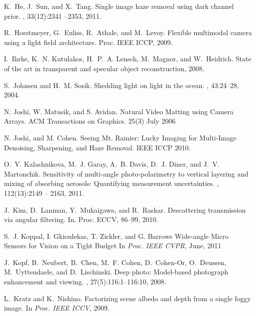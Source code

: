 \documentclass[10pt,twocolumn,letterpaper]{article}
\begin{document}
{\begin{thebibliography}{10}
K.~He, J.~Sun, and X.~Tang.
\newblock Single image haze removal using dark channel prior.
, 33(12):2341 --2353, 2011.

R.~Horstmeyer, G.~Euliss, R.~Athale, and M.~Levoy.
\newblock Flexible multimodal camera using a light field architecture.
\newblock Proc. IEEE ICCP, 2009.

I.~Ihrke, K.~N. Kutulakos, H.~P.~A. Lensch, M.~Magnor, and W.~Heidrich.
\newblock State of the art in transparent and specular object reconstruction,
  2008.

S.~Johnsen and H.~M. Sosik.
\newblock Shedding light on light in the ocean.
, 43:24--28, 2004.

N. Joshi, W. Matusik, and S. Avidan.
\newblock Natural Video Matting using Camera Arrays.
\newblock ACM Transactions on Graphics. 25(3) July 2006

N. Joshi, and M. Cohen.
\newblock Seeing Mt. Rainier: Lucky Imaging for Multi-Image Denoising, Sharpening, and Haze Removal.
\newblock IEEE ICCP 2010.

O.~V. Kalashnikova, M.~J. Garay, A.~B. Davis, D.~J. Diner, and J.~V.
  Martonchik.
\newblock Sensitivity of multi-angle photo-polarimetry to vertical layering and
  mixing of absorbing aerosols: Quantifying measurement uncertainties.
,
  112(13):2149 -- 2163, 2011.

J.~Kim, D.~Lanman, Y.~Mukaigawa, and R.~Raskar.
\newblock Descattering transmission via angular filtering.
\newblock In. Proc. ECCV, 86--99, 2010.


S.~J. Koppal, I. Gkioulekas, T. Zickler, and G. Barrows
\newblock Wide-angle Micro Sensors for Vision on a Tight Budget
\newblock In {\em Proc. IEEE CVPR}, June, 2011

J.~Kopf, B.~Neubert, B.~Chen, M.~F. Cohen, D.~Cohen-Or, O.~Deussen,
  M.~Uyttendaele, and D.~Lischinski.
\newblock Deep photo: Model-based photograph enhancement and viewing.
, 27(5):116:1--116:10, 2008.

L.~Kratz and K.~Nishino.
\newblock Factorizing scene albedo and depth from a single foggy image.
\newblock In {\em Proc. IEEE ICCV}, 2009.


\end{thebibliography}}
\end{document}
